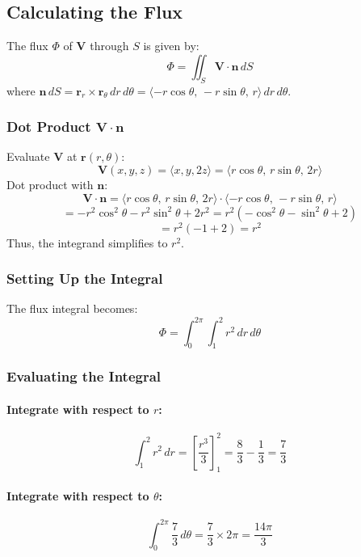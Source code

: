 \documentclass[11pt]{article}
\begin{document}
\newpage

\subsection{Calculating the Flux}

The flux \( \Phi \) of \( \mathbf{V} \) through \( S \) is given by:
\[
\Phi = \iint_{S} \mathbf{V} \cdot \mathbf{n} \, dS
\]
where \( \mathbf{n} \, dS = \mathbf{r}_r \times \mathbf{r}_\theta \, dr \, d\theta = \langle -r \cos\theta, \, -r \sin\theta, \, r \rangle \, dr \, d\theta \).

\subsubsection*{Dot Product \( \mathbf{V} \cdot \mathbf{n} \)}

Evaluate \( \mathbf{V} \) at \( \mathbf{r}(r, \theta) \):
\[
\mathbf{V}(x, y, z) = \langle x, y, 2z \rangle = \langle r \cos\theta, \, r \sin\theta, \, 2r \rangle
\]
Dot product with \( \mathbf{n} \):
\[
\mathbf{V} \cdot \mathbf{n} = \langle r \cos\theta, \, r \sin\theta, \, 2r \rangle \cdot \langle -r \cos\theta, \, -r \sin\theta, \, r \rangle \] \[= -r^2 \cos^2\theta - r^2 \sin^2\theta + 2r^2 = r^2 ( -\cos^2\theta - \sin^2\theta + 2 ) \] \[ = r^2 ( -1 + 2 ) = r^2
\]
Thus, the integrand simplifies to \( r^2 \).

\subsubsection*{Setting Up the Integral}

The flux integral becomes:
\[
\Phi = \int_{0}^{2\pi} \int_{1}^{2} r^2 \, dr \, d\theta
\]

\subsubsection*{Evaluating the Integral}

\paragraph{Integrate with respect to \( r \):}
\[
\int_{1}^{2} r^2 \, dr = \left[ \frac{r^3}{3} \right]_{1}^{2} = \frac{8}{3} - \frac{1}{3} = \frac{7}{3}
\]

\paragraph{Integrate with respect to \( \theta \):}
\[
\int_{0}^{2\pi} \frac{7}{3} \, d\theta = \frac{7}{3} \times 2\pi = \frac{14\pi}{3}
\]
\end{document}

